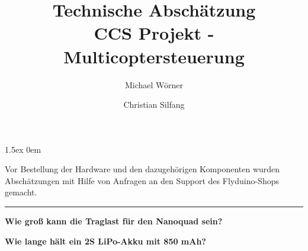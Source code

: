 \documentclass[a4paper,12pt]{article}
\begin{document}
\title{
\textbf{Technische Abschätzung}\\ 
CCS Projekt - Multicoptersteuerung
}
\author{Michael Wörner \and Christian Silfang}
\date{}

\parskip1.5ex
\parindent0em

\maketitle

Vor Bestellung der Hardware und den dazugehörigen Komponenten wurden Abschätzungen mit Hilfe von Anfragen an den Support des Flyduino-Shops gemacht.

\noindent\rule[1ex]{\textwidth}{1pt}
\vspace{1cm}

\textbf{Wie groß kann die Traglast für den Nanoquad sein?}

\textbf{Wie lange hält ein 2S LiPo-Akku mit 850 mAh?} 
\end{document}
